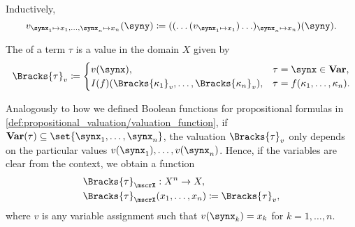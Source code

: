 \begin{definition}
\begin{thmenum}
    Inductively,
    \begin{equation*}
      v_{\synx_1 \mapsto x_1, \ldots, \synx_n \mapsto x_n}(\syny) \coloneqq ((\ldots(v_{\synx_1 \mapsto x_1})\ldots)_{\synx_n \mapsto x_n})(\syny).
    \end{equation*}

     The  of a term \( \tau \) is a value in the domain \( X \) given by
    \begin{equation}\label{eq:def:first_order_valuation/term_valuation}
      \Bracks{\tau}_v \coloneqq \begin{cases}
        v(\synx),                                                 &\tau = \synx \in \op*{Var}, \\
        I(f)(\Bracks{\kappa_1}_v, \ldots, \Bracks{\kappa_n}_v), &\tau = f(\kappa_1, \ldots, \kappa_n).
      \end{cases}
    \end{equation}

     Analogously to how we defined Boolean functions for propositional formulas in \cref{def:propositional_valuation/valuation_function}, if \( \op*{Var}(\tau) \subseteq \set{ \synx_1, \ldots, \synx_n } \), the valuation \( \Bracks{\tau}_v \) only depends on the particular values \( v(\synx_1), \ldots, v(\synx_n) \). Hence, if the variables are clear from the context, we obtain a function
    \begin{equation*}
      \begin{aligned}
        &\Bracks{\tau}_\mscrX: X^n \to X, \\
        &\Bracks{\tau}_\mscrX(x_1, \ldots, x_n) \coloneqq \Bracks{\tau}_v,
      \end{aligned}
    \end{equation*}
    where \( v \) is any variable assignment such that \( v(\synx_k) = x_k \) for \( k = 1, \ldots, n \).


\end{thmenum}
\end{definition}
